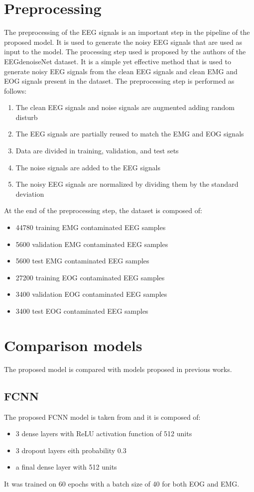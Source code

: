 \documentclass[a4paper]{sapthesis}
\begin{document}
\section{Preprocessing}
The preprocessing of the EEG signals is an important step in the
pipeline of the proposed model. It is used to generate the noisy EEG
signals that are used as input to the model.
The processing step used is proposed by the authors of the EEGdenoiseNet
dataset\cite{EEGdenoiseNet}. It is a simple yet effective method that
is used to generate noisy EEG signals from the clean EEG signals and clean 
EMG and EOG signals present in the dataset.
The preprocessing step is performed as follows:
\begin{enumerate}
\item The clean EEG signals and noise signals are augmented adding 
random disturb
\item The EEG signals are partially reused to match the EMG and EOG
signals
\item Data are divided in training, validation, and test sets
\item The noise signals are added to the EEG signals
\item The noisy EEG signals are normalized by dividing them by the
standard deviation
\end{enumerate}
At the end of the preprocessing step, the dataset is composed of:
\begin{itemize}
\item 44780 training EMG contaminated EEG samples
\item 5600 validation EMG contaminated EEG samples
\item 5600 test EMG contaminated EEG samples
\item 27200 training EOG contaminated EEG samples
\item 3400 validation EOG contaminated EEG samples
\item 3400 test EOG contaminated EEG samples
\end{itemize}
\section{Comparison models}
The proposed model is compared with models proposed in previous works.
\subsection{FCNN}\label{sec:model_fcnn}
The proposed FCNN model is taken from\cite{EEGdenoiseNet} and it is 
composed of:
\begin{itemize}
\item 3 dense layers with ReLU activation function of 512 units
\item 3 dropout layers eith probability 0.3
\item a final dense layer with 512 units
\end{itemize}
It was trained on 60 epochs with a batch size of 40 for both EOG and EMG.
\end{document}
